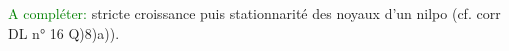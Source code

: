 \textcolor{green}{A compléter:} stricte croissance puis stationnarité des noyaux d'un nilpo (cf. corr DL n° 16 Q)8)a)).